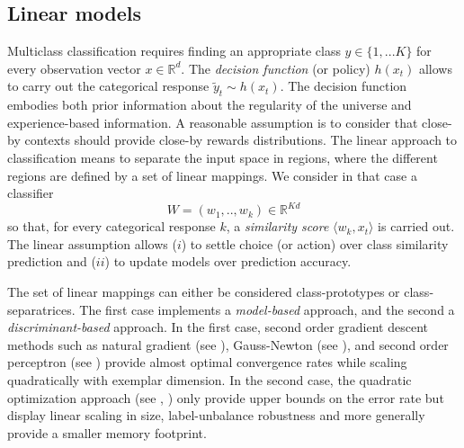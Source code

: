\documentclass[preprint,12pt,authoryear]{elsarticle}
\begin{document}
\subsection{Linear models}
Multiclass classification requires  finding an appropriate class $y \in \{1,... K\}$ for every observation vector $x \in \mathbb{R}^d$.
The \textit{decision function} (or policy) $h(x_t)$
allows to carry out the categorical response $\tilde{y}_t \sim h(x_t)$. The decision function embodies both prior information about the regularity of the universe and experience-based information. A reasonable assumption  is to consider that  close-by contexts should provide close-by rewards distributions. 
The linear approach to classification means to separate the input space in regions, where the different regions are defined by a set of linear mappings. We consider in that case a  classifier 
\begin{equation}\label{eq:W}
W = (w_1,..,w_k) \in \mathbb{R}^{K d}
\end{equation} so that, for every categorical response $k$, a \emph{similarity score} $\langle w_k, x_t\rangle$ is carried out. 
The linear assumption allows ($i$) to 
settle choice (or action) over class similarity prediction and ($ii$) to update models over prediction accuracy.

The set of linear mappings can either be considered class-prototypes or class-separatrices. The first case implements a \textit{model-based} approach, and the second a \textit{discriminant-based} approach. In the first case,  second order gradient descent methods such as natural gradient (see \cite{amari2000adaptive}), Gauss-Newton (see \cite{le2004large}), and second order perceptron (see \cite{cesa2005second}) provide almost optimal convergence rates while scaling quadratically with exemplar dimension.
In the second case, the quadratic optimization approach (see \cite{anlauf1989adatron}, \cite{crammer2006online}) only provide upper bounds on the error rate but display linear scaling in size, label-unbalance robustness and more generally provide a smaller memory footprint. 
\end{document}

